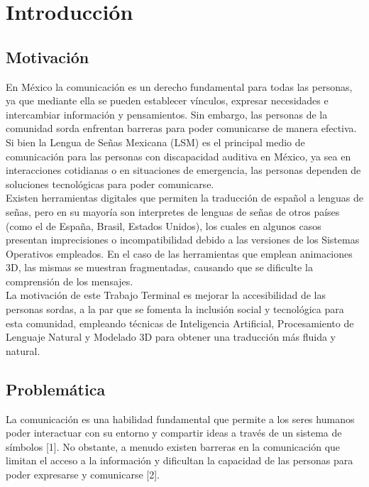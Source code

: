 \chapter{Introducción}
\section{Motivación}
En México la comunicación es un derecho fundamental para todas las personas, ya que mediante ella se pueden establecer vínculos, expresar necesidades e intercambiar información y pensamientos. Sin embargo, las personas de la comunidad sorda enfrentan barreras para poder comunicarse de manera efectiva. \\

Si bien la Lengua de Señas Mexicana (LSM) es el principal medio de comunicación para las personas con discapacidad auditiva en México, ya sea en interacciones cotidianas o en situaciones de emergencia, las personas dependen de soluciones tecnológicas para poder comunicarse. \\

Existen herramientas digitales que permiten la traducción de español a lenguas de señas, pero en su mayoría son interpretes de lenguas de señas de otros países (como el de España, Brasil, Estados Unidos), los cuales en algunos casos presentan imprecisiones o incompatibilidad debido a las versiones de los Sistemas Operativos empleados. En el caso de las herramientas que emplean animaciones 3D, las mismas se muestran fragmentadas, causando que se dificulte la comprensión de los mensajes.\\

La motivación de este Trabajo Terminal es mejorar la accesibilidad de las personas sordas, a la par que se fomenta la inclusión social y tecnológica para esta comunidad, empleando técnicas de Inteligencia Artificial, Procesamiento de Lenguaje Natural y Modelado 3D para obtener una traducción más fluida y natural.\\


\newpage
\section{Problemática}
La comunicación es una habilidad fundamental que permite a los seres humanos poder interactuar con su entorno y compartir ideas a través de un sistema de símbolos [1]. No obstante, a menudo existen barreras en la comunicación que limitan el acceso a la información y dificultan la capacidad de las personas para poder expresarse y comunicarse [2]. \\


